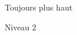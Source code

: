 \documentclass[preview]{standalone}
\begin{document}
\begin{center}
Toujours plus haut
    
    Niveau 2
\end{center}
\end{document}

